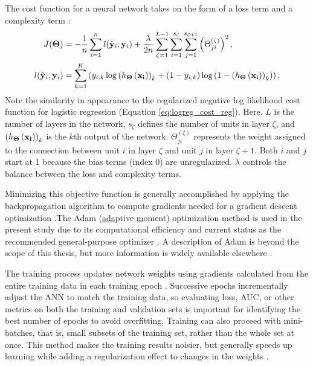 The cost function for a neural network takes on the form of a loss term and a complexity term \citep{ng_neural_2011}:
\begin{equation}
\label{eq:nn_cost_function}
    \begin{aligned}
        J(\boldsymbol\Theta) &= 
        -\frac{1}{n}\sum_{i=1}^{n} 
        l(\hat{\bf y}_i,{\bf y}_i) + 
        \frac{\lambda}{2n}
        \sum_{\zeta=1}^{L-1}
        \sum_{i=1}^{s_\zeta}
        \sum_{j=1}^{s_{\zeta+1}}\left(\Theta_{ji}^{(\zeta)}\right)^2, \\
        l(\hat{\bf y}_i,{\bf y}_i)&= 
        \sum_{k=1}^{K}\left( 
        y_{i,k}\log{\left(h_{\boldsymbol\Theta}\left(\bf{x}_i\right)\right)_k}+ 
        \left(1-y_{i,k}\right)\log\left(1-\left(h_{\boldsymbol\Theta}\left(\bf{x}_i\right)\right)_k\right)\right),
    \end{aligned}
\end{equation}
Note the similarity in appearance to the regularized negative log likelihood cost function for logistic regression (Equation \ref{eq:logreg_cost_reg}). Here, $L$ is the number of layers in the network, $s_\zeta$ defines the number of units in layer $\zeta$, and $\left(h_{\boldsymbol\Theta}\left(\bf{x}_i\right)\right)_k$ is the $k$th output of the network. $\Theta_{ji}^{(\zeta)}$ represents the weight assigned to the connection between unit $i$ in layer $\zeta$ and unit $j$ in layer $\zeta+1$. Both $i$ and $j$ start at 1 because the bias terms (index 0) are unregularized. $\lambda$ controls the balance between the loss and complexity terms. 

Minimizing this objective function is generally accomplished by applying the backpropagation algorithm to compute gradients needed for a gradient descent optimization \citep[p.\ 396]{hastie_elements_2009}.The Adam (\uline{ada}ptive \uline{m}oment) optimization method is used in the present study due to its computational efficiency and current status as the recommended general-purpose optimizer \citep{brownlee_gentle_2017}. A description of Adam is beyond the scope of this thesis, but more information is widely available elsewhere \citep[e.g.,\ ][]{kingma_adam_2017}.

The training process updates network weights using gradients calculated from the entire training data in each training epoch \citep[p.\ 397]{hastie_elements_2009}. Successive epochs incrementally adjust the ANN to match the training data, so evaluating loss, AUC, or other metrics on both the training and validation sets is important for identifying the best number of epochs to avoid overfitting. Training can also proceed with mini-batches, that is, small subsets of the training set, rather than the whole set at once. This method makes the training results noisier, but generally speeds up learning while adding a regularization effect to changes in the weights \citep{brownlee_how_2019}.

